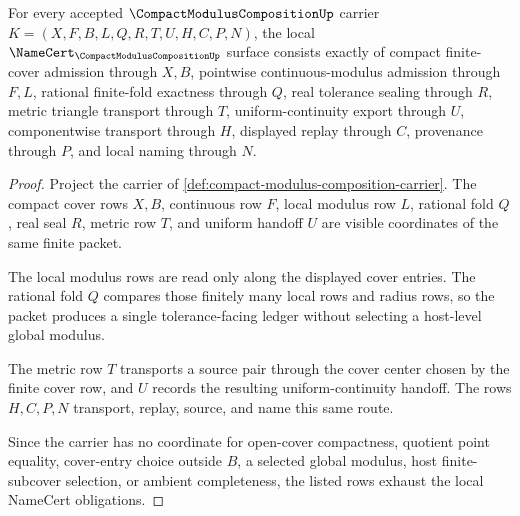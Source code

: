 \begin{theorem}
\label{thm:compact-modulus-composition-namecert-obligations}
For every accepted $\CompactModulusCompositionUp$ carrier $K=(X,F,B,L,Q,R,T,U,H,C,P,N)$, the local $\NameCert_{\CompactModulusCompositionUp}$ surface consists exactly of compact finite-cover admission through $X,B$, pointwise continuous-modulus admission through $F,L$, rational finite-fold exactness through $Q$, real tolerance sealing through $R$, metric triangle transport through $T$, uniform-continuity export through $U$, componentwise transport through $H$, displayed replay through $C$, provenance through $P$, and local naming through $N$.
\end{theorem}
\begin{proof}
Project the carrier of \autoref{def:compact-modulus-composition-carrier}. The compact cover rows $X,B$, continuous row $F$, local modulus row $L$, rational fold $Q$, real seal $R$, metric row $T$, and uniform handoff $U$ are visible coordinates of the same finite packet.

The local modulus rows are read only along the displayed cover entries. The rational fold $Q$ compares those finitely many local rows and radius rows, so the packet produces a single tolerance-facing ledger without selecting a host-level global modulus.

The metric row $T$ transports a source pair through the cover center chosen by the finite cover row, and $U$ records the resulting uniform-continuity handoff. The rows $H,C,P,N$ transport, replay, source, and name this same route.

Since the carrier has no coordinate for open-cover compactness, quotient point equality, cover-entry choice outside $B$, a selected global modulus, host finite-subcover selection, or ambient completeness, the listed rows exhaust the local NameCert obligations.
\end{proof}

